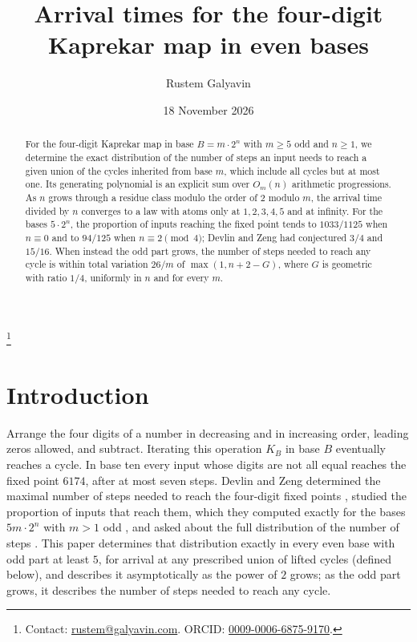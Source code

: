 \documentclass[11pt]{amsart}
\theoremstyle{remark}
\begin{document}
\title{Arrival times for the four-digit Kaprekar map in even bases}
\author{Rustem Galyavin}
\thanks{Contact: \href{mailto:rustem@galyavin.com}{rustem@galyavin.com}. ORCID: \href{https://orcid.org/0009-0006-6875-9170}{0009-0006-6875-9170}.}
\date{18 November 2026}

\begin{abstract}
For the four-digit Kaprekar map in base $B=m\cdot2^n$ with $m\ge5$ odd and $n\ge1$, we determine the exact distribution of the number of steps an input needs to reach a given union of the cycles inherited from base $m$, which include all cycles but at most one. Its generating polynomial is an explicit sum over $O_m(n)$ arithmetic progressions. As $n$ grows through a residue class modulo the order of $2$ modulo $m$, the arrival time divided by $n$ converges to a law with atoms only at $1,2,3,4,5$ and at infinity. For the bases $5\cdot2^n$, the proportion of inputs reaching the fixed point tends to $1033/1125$ when $n\equiv0$ and to $94/125$ when $n\equiv2\pmod4$; Devlin and Zeng had conjectured $3/4$ and $15/16$. When instead the odd part grows, the number of steps needed to reach any cycle is within total variation $26/m$ of $\max(1,n+2-G)$, where $G$ is geometric with ratio $1/4$, uniformly in $n$ and for every $m$.
\end{abstract}

\maketitle

\section{Introduction}

Arrange the four digits of a number in decreasing and in increasing order, leading zeros allowed, and subtract. Iterating this operation $K_B$ in base $B$ eventually reaches a cycle. In base ten every input whose digits are not all equal reaches the fixed point $6174$, after at most seven steps. Devlin and Zeng determined the maximal number of steps needed to reach the four-digit fixed points \cite[Theorem~1]{DZ}, studied the proportion of inputs that reach them, which they computed exactly for the bases $5m\cdot2^n$ with $m>1$ odd \cite[Theorem~2]{DZ}, and asked about the full distribution of the number of steps \cite[Section~5]{DZ}. This paper determines that distribution exactly in every even base with odd part at least $5$, for arrival at any prescribed union of lifted cycles (defined below), and describes it asymptotically as the power of $2$ grows; as the odd part grows, it describes the number of steps needed to reach any cycle.
\end{document}
